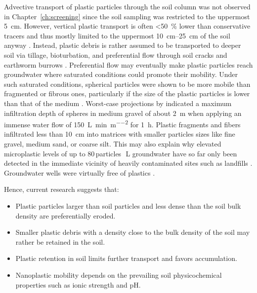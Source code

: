 Advective transport of plastic particles through the soil column was not observed in Chapter~\ref{ch:screening} since the soil sampling was restricted to the uppermost \SI{5}{\centi\meter}. However, vertical plastic transport is often \SI{<50}{\percent} lower than conservative tracers and thus mostly limited to the uppermost \SIrange{10}{25}{\centi\meter} of the soil anyway \citep{KellerTransport2020,WuTransport2020}. Instead, plastic debris is rather assumed to be transported to deeper soil via tillage, bioturbation, and preferential flow through soil cracks and earthworm burrows \citep{RilligMicroplastic2017a,YuLeaching2019,LiVertical2021}. Preferential flow may eventually make plastic particles reach groundwater where saturated conditions could promote their mobility. Under such saturated conditions, spherical particles were shown to be more mobile than fragmented or fibrous ones, particularly if the size of the plastic particles is lower than that of the medium \citep{WaldschlagerInfiltration2020}. Worst-case projections by \citet{WaldschlagerInfiltration2020} indicated a maximum infiltration depth of spheres in medium gravel of about \SI{2}{\meter} when applying an immense water flow of \SI{150}{\liter\per\minute\per\square\meter} for \SI{1}{\hour}. Plastic fragments and fibers infiltrated less than \SI{10}{\centi\meter} into matrices with smaller particles sizes like fine gravel, medium sand, or coarse silt.
This may also explain why elevated microplastic levels of up to \num{80}\,particles\,\si{\per\liter} groundwater have so far only been detected in the immediate vicinity of heavily contaminated sites such as landfills \citep{ManikandaBharathSpatial2021}. Groundwater wells were virtually free of plastics \citep{MintenigLow2019}.

Hence, current research suggests that:

\begin{itemize}
	\item Plastic particles larger than soil particles and less dense than the soil bulk density are preferentially eroded.
	\item Smaller plastic debris with a density close to the bulk density of the soil may rather be retained in the soil.
	\item Plastic retention in soil limits further transport and favors accumulation.
	\item Nanoplastic mobility depends on the prevailing soil physicochemical properties such as ionic strength and pH.
\end{itemize}

